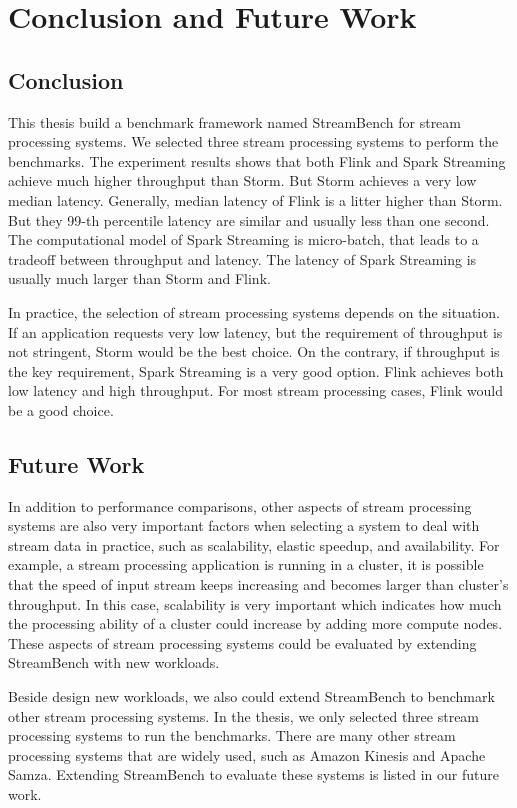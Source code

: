 \chapter{Conclusion and Future Work}

\section{Conclusion}

This thesis build a benchmark framework named StreamBench for stream processing systems. We selected three stream processing systems to perform the benchmarks. The experiment results shows that both Flink and Spark Streaming achieve much higher throughput than Storm. But Storm achieves a very low median latency. Generally, median latency of Flink is a litter higher than Storm. But they 99-th percentile latency are similar and usually less than one second. The computational model of Spark Streaming is micro-batch, that leads to a tradeoff between throughput and latency. The latency of Spark Streaming is usually much larger than Storm and Flink. 

In practice, the selection of stream processing systems depends on the situation. If an application requests very low latency, but the requirement of throughput is not stringent, Storm would be the best choice. On the contrary, if throughput is the key requirement, Spark Streaming is a very good option. Flink achieves both low latency and high throughput. For most stream processing cases, Flink would be a good choice. 

\section{Future Work}

In addition to performance comparisons, other aspects of stream processing systems are also very important factors when selecting a system to deal with stream data in practice, such as scalability, elastic speedup, and availability. For example, a stream processing application is running in a cluster, it is possible that the speed of input stream keeps increasing and becomes larger than cluster's throughput. In this case, scalability is very important which indicates how much the processing ability of a cluster could increase by adding more compute nodes. These aspects of stream processing systems could be evaluated by extending StreamBench with new workloads.

Beside design new workloads, we also could extend StreamBench to benchmark other stream processing systems. In the thesis, we only selected three stream processing systems to run the benchmarks. There are many other stream processing systems that are widely used, such as Amazon Kinesis and Apache Samza. Extending StreamBench to evaluate these systems is listed in our future work.

